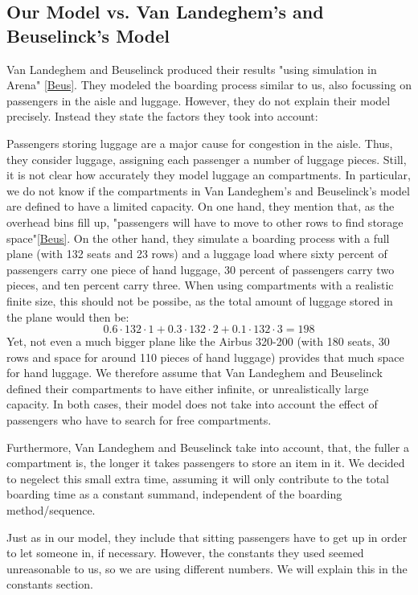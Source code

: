 \documentclass[11pt]{article}
\begin{document}
\subsection{Our Model vs. Van Landeghem's and Beuselinck's Model} 

Van Landeghem and Beuselinck produced their results "using simulation in Arena" \ref{Beus}. They modeled the boarding process similar to us, also focussing on passengers in the aisle and luggage. However, they do not explain their model precisely. Instead they state the factors they took into account:


Passengers storing luggage are a major cause for congestion in the aisle. Thus, they consider luggage, assigning each passenger a number of luggage pieces. Still, it is not clear how accurately they model luggage an compartments. In particular, we do not know if the compartments in Van Landeghem's and Beuselinck's model are defined to have a limited capacity. On one hand, they mention that, as the overhead bins fill up, "passengers will have to move to other rows to find storage space"\ref{Beus}. On the other hand, they simulate a boarding process with a full plane (with 132 seats and 23 rows) and a luggage load where sixty percent of passengers carry one piece of hand luggage, 30 percent of passengers carry two pieces, and ten percent carry three. When using compartments with a realistic finite size, this should not be possibe, as the total amount of luggage stored in the plane would then be:
$$ 0.6 \cdot 132 \cdot 1+ 0.3 \cdot 132 \cdot 2 + 0.1 \cdot 132 \cdot 3 = 198$$
Yet, not even a much bigger plane like the Airbus 320-200 (with 180 seats, 30 rows and space for around 110 pieces of hand luggage) provides that much space for hand luggage. We therefore assume that Van Landeghem and Beuselinck defined their compartments to have either infinite, or unrealistically large capacity. In both cases, their model does not take into account the effect of passengers who have to search for free compartments.


Furthermore, Van Landeghem and Beuselinck take into account, that, the fuller a compartment is, the longer it takes passengers to store an item in it. We decided to negelect this small extra time, assuming it will only contribute to the total boarding time as a constant summand, independent of the boarding method/sequence.


Just as in our model, they include that sitting passengers have to get up in order to let someone in, if necessary. However, the constants they used seemed unreasonable to us, so we are using different numbers. We will explain this in the constants section.
\end{document}
